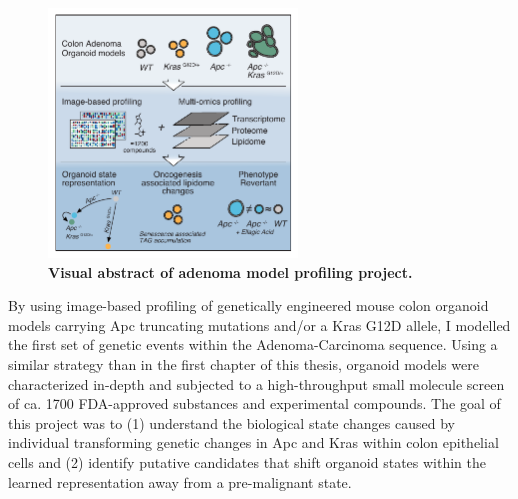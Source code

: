 \begin{flushleft}
\begin{figure}[h]
\centering
\includegraphics[width=250,
                height=\textheight,
                keepaspectratio]{figures/adenomaprofiling/pdf/fig_0_2.pdf}
\caption{\textbf{Visual abstract of adenoma model profiling project.}}
\label{fig_a02}
\end{figure}
\bigbreak


By using image-based profiling of genetically engineered mouse colon organoid models carrying Apc truncating mutations and/or a Kras G12D allele, I modelled the first set of genetic events within the Adenoma-Carcinoma sequence. Using a similar strategy than in the first chapter of this thesis, organoid models were characterized in-depth and subjected to a high-throughput small molecule screen of ca. 1700 FDA-approved substances and experimental compounds. The goal of this project was to (1) understand the biological state changes caused by individual transforming genetic changes in Apc and Kras within colon epithelial cells and (2) identify putative candidates that shift organoid states within the learned representation away from a pre-malignant state. 



\end{flushleft}
